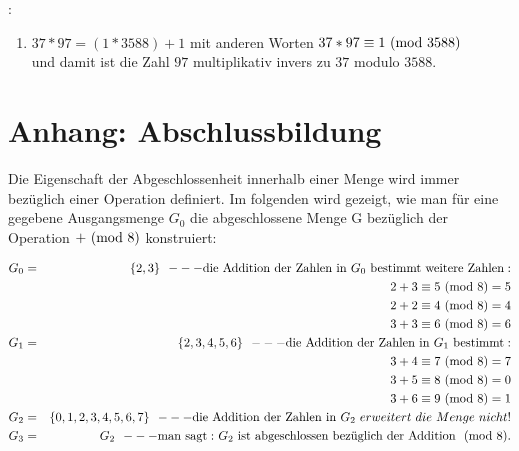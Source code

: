 \begin{refsegment}
\begin{example}{:}
\begin{enumerate}
   \item $37*97 = (1*3588)+1$ mit anderen Worten $37*97 \equiv 1 {\rm ~(mod~} 3588)$\\
                 und damit ist die Zahl $97$ multiplikativ invers zu $37$ modulo $3588$.

\end{enumerate}

\end{example}



\hypertarget{nt:NumberTheory_Appendix_B}{}
\section{Anhang: Abschlussbildung}
\label{nt:NumberTheory_Appendix_B}{}

Die Eigenschaft der Abgeschlossenheit innerhalb einer Menge
wird immer bezüglich einer Operation definiert.
Im folgenden wird gezeigt, wie man für eine gegebene Ausgangsmenge $G_0$ die
abgeschlossene Menge G bezüglich der Operation $+ {\rm ~(mod~} 8)$ konstruiert:

\begin{eqnarray*}
G_0 & = & \{ 2, 3 \} {\rm ~~--- die~Addition~der~Zahlen~in~} G_0
{\rm ~bestimmt~weitere~Zahlen:} \nonumber\\
    & &    2 + 3 \equiv 5{\rm ~(mod~}8) = 5 \nonumber\\
    & &    2 + 2 \equiv 4{\rm ~(mod~}8) = 4 \nonumber\\
    & &    3 + 3 \equiv 6{\rm ~(mod~}8) = 6 \nonumber\\
G_1 & = & \{ 2, 3, 4, 5, 6 \} {\rm ~~--- die~Addition~der~Zahlen~in~} G_1
{\rm ~bestimmt:}\nonumber\\
    & &    3 + 4 \equiv 7{\rm ~(mod~}8) = 7 \nonumber\\
    & &    3 + 5 \equiv 8{\rm ~(mod~}8) = 0 \nonumber\\
    & &    3 + 6 \equiv 9{\rm ~(mod~}8) = 1 \nonumber\\
G_2 & = & \{ 0, 1, 2, 3, 4, 5, 6, 7 \} {\rm ~~--- die~Addition~der~Zahlen~in~} G_2
{~erweitert~die~Menge~nicht!} \nonumber\\
G_3 & = & G_2 {\rm ~~--- man~sagt:~} G_2
\mbox{\rm~ist~abgeschlossen~bezüglich~der~Addition~~(mod~}8). \nonumber
\end{eqnarray*}




\end{refsegment}
